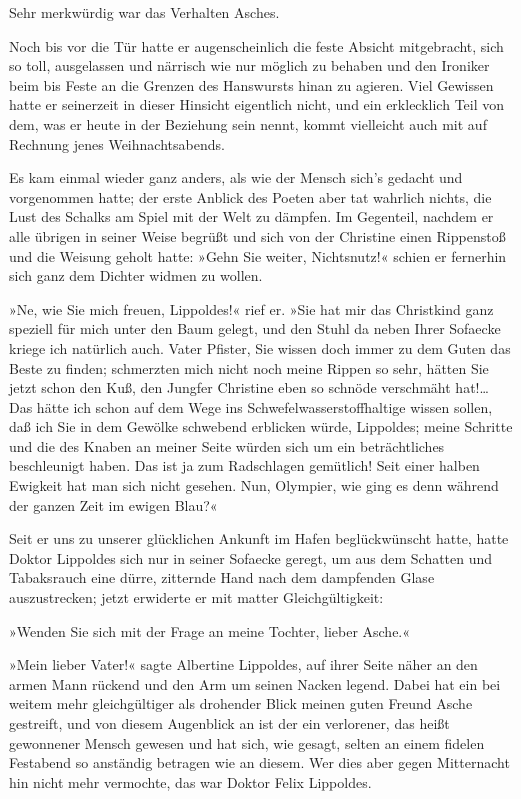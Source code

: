Sehr merkwürdig war das Verhalten Asches.

Noch bis vor die Tür hatte er augenscheinlich die feste Absicht
mitgebracht, sich so toll, ausgelassen und närrisch wie nur möglich
zu behaben und den Ironiker beim bis Feste an die Grenzen des
Hanswursts hinan zu agieren. Viel Gewissen hatte er seinerzeit in
dieser Hinsicht eigentlich nicht, und ein erklecklich Teil von dem,
was er heute in der Beziehung sein nennt, kommt vielleicht auch mit
auf Rechnung jenes Weihnachtsabends.

Es kam einmal wieder ganz anders, als wie der Mensch sich's gedacht
und vorgenommen hatte; der erste Anblick des Poeten aber tat
wahrlich nichts, die Lust des Schalks am Spiel mit der Welt zu
dämpfen. Im Gegenteil, nachdem er alle übrigen in seiner Weise
begrüßt und sich von der Christine einen Rippenstoß und die Weisung
geholt hatte: »Gehn Sie weiter, Nichtsnutz!« schien er fernerhin
sich ganz dem Dichter widmen zu wollen.

»Ne, wie Sie mich freuen, Lippoldes!« rief er. »Sie hat mir das
Christkind ganz speziell für mich unter den Baum gelegt, und den
Stuhl da neben Ihrer Sofaecke kriege ich natürlich auch. Vater
Pfister, Sie wissen doch immer zu dem Guten das Beste zu finden;
schmerzten mich nicht noch meine Rippen so sehr, hätten Sie jetzt
schon den Kuß, den Jungfer Christine eben so schnöde verschmäht
hat!\ldots{} Das hätte ich schon auf dem Wege ins
Schwefelwasserstoffhaltige wissen sollen, daß ich Sie in dem
Gewölke schwebend erblicken würde, Lippoldes; meine Schritte und
die des Knaben an meiner Seite würden sich um ein beträchtliches
beschleunigt haben. Das ist ja zum Radschlagen gemütlich! Seit
einer halben Ewigkeit hat man sich nicht gesehen. Nun, Olympier,
wie ging es denn während der ganzen Zeit im ewigen Blau?«

Seit er uns zu unserer glücklichen Ankunft im Hafen beglückwünscht
hatte, hatte Doktor Lippoldes sich nur in seiner Sofaecke geregt,
um aus dem Schatten und Tabaksrauch eine dürre, zitternde Hand nach
dem dampfenden Glase auszustrecken; jetzt erwiderte er mit matter
Gleichgültigkeit:

»Wenden Sie sich mit der Frage an meine Tochter, lieber Asche.«

»Mein lieber Vater!« sagte Albertine Lippoldes, auf ihrer Seite
näher an den armen Mann rückend und den Arm um seinen Nacken
legend. Dabei hat ein bei weitem mehr gleichgültiger als drohender
Blick meinen guten Freund Asche gestreift, und von diesem
Augenblick an ist der ein verlorener, das heißt gewonnener Mensch
gewesen und hat sich, wie gesagt, selten an einem fidelen Festabend
so anständig betragen wie an diesem. Wer dies aber gegen
Mitternacht hin nicht mehr vermochte, das war Doktor Felix
Lippoldes.

